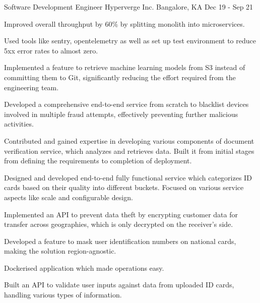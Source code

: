 \begin{cventries}
  \cventry
    {Software Development Engineer}
    {Hyperverge Inc.}
    {Bangalore, KA}
    {Dec 19  - Sep 21}
    {
      \begin{cvitems}
        \item {Improved overall throughput by 60\% by splitting monolith into microservices.}
        \item {Used tools like sentry, opentelemetry as well as set up test environment to reduce 5xx error rates to almost zero.}
        \item {Implemented a feature to retrieve machine learning models from S3 instead of committing them to Git, significantly reducing the effort required from the engineering team.}
        \item {Developed a comprehensive end-to-end service from scratch to blacklist devices involved in multiple fraud attempts, effectively preventing further malicious activities.}
        \item {Contributed and gained expertise in developing various components of document verification service, which analyzes and retrieves data. Built it from initial stages from defining the requirements to completion of deployment.}
        \item {Designed and developed end-to-end fully functional service which categorizes ID cards based on their quality into different buckets. Focused on various service aspects like scale and configurable design.}
        \item {Implemented an API to prevent data theft by encrypting customer data for transfer across geographies, which is only decrypted on the receiver's side.}
        \item {Developed a feature to mask user identification numbers on national cards, making the solution region-agnostic.}
        \item {Dockerised application which made operations easy.}
        \item {Built an API to validate user inputs against data from uploaded ID cards, handling various types of information.}
      \end{cvitems}
    }

\end{cventries}
